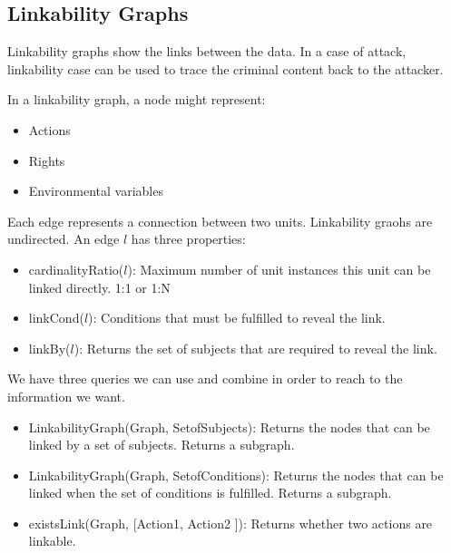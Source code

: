 \documentclass[11pt]{article} %
\begin{document}
\subsection{Linkability Graphs}

Linkability graphs show the links between the data. In a case of attack, linkability case can be used to trace the criminal content back to the attacker.

In a linkability graph, a node might represent:

\begin{itemize}
\item Actions
\item Rights
\item Environmental variables
\end{itemize}

Each edge represents a connection between two units. Linkability graohs are undirected. An edge \(l\) has three properties:

\begin{itemize}
\item cardinalityRatio(\(l\)): Maximum number of unit instances this unit can be linked directly. 1:1 or 1:N
\item linkCond(\(l\)): Conditions that must be fulfilled to reveal the link.
\item linkBy(\(l\)): Returns the set of subjects that are required to reveal the link.
\end{itemize}

We have three queries we can use and combine in order to reach to the information we want.

\begin{itemize}

\item LinkabilityGraph(Graph, SetofSubjects): Returns the nodes that can be linked by a set of subjects. Returns a subgraph.
\item LinkabilityGraph(Graph, SetofConditions): Returns the nodes that can be linked when the set of conditions is fulfilled. Returns a subgraph.
\item existsLink(Graph, [Action1, Action2 ]): Returns whether two actions are linkable.
\end{itemize}
\end{document}

